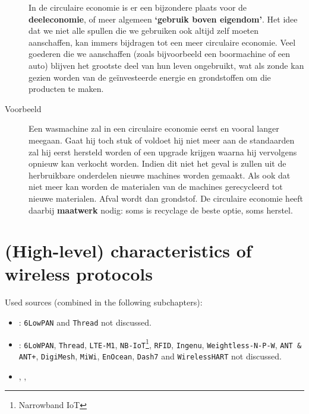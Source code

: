 \documentclass[11pt,a4paper,twoside]{article} %
\begin{document}
\begin{description}
	In de circulaire economie is er een bijzondere plaats voor de \textbf{deeleconomie}, of meer algemeen \textbf{`gebruik boven eigendom'}. Het idee dat we niet alle spullen die we gebruiken ook altijd zelf moeten aanschaffen, kan immers bijdragen tot een meer circulaire economie. Veel goederen die we aanschaffen (zoals bijvoorbeeld een boormachine of een auto) blijven het grootste deel van hun leven ongebruikt, wat als zonde kan gezien worden van de geïnvesteerde energie en grondstoffen om die producten te maken.

	\vspace{0.5cm}

	\item [Voorbeeld] Een wasmachine zal in een circulaire economie eerst en vooral langer meegaan. Gaat hij toch stuk of voldoet hij niet meer aan de standaarden zal hij eerst hersteld worden of een upgrade krijgen waarna hij vervolgens opnieuw kan verkocht worden. Indien dit niet het geval is zullen uit de herbruikbare onderdelen nieuwe machines worden gemaakt. Als ook dat niet meer kan worden de materialen van de machines gerecycleerd tot nieuwe materialen. Afval wordt dan grondstof. De circulaire economie heeft daarbij \textbf{maatwerk} nodig: soms is recyclage de beste optie, soms herstel.
\end{description}


\section{(High-level) characteristics of wireless protocols}

Used sources (combined in the following subchapters):
\vspace{-0.5cm}
\begin{itemize}
	\itemsep0em
	\item \cite{wireless1}: \texttt{6LowPAN} and \texttt{Thread} not discussed.
	\item \cite{wireless2}: \texttt{6LoWPAN}, \texttt{Thread}, \texttt{LTE-M1}, \texttt{NB-IoT}\footnote{Narrowband IoT}, \texttt{RFID}, \texttt{Ingenu}, \texttt{Weightless-N-P-W}, \texttt{ANT \& ANT+}, \texttt{DigiMesh}, \texttt{MiWi}, \texttt{EnOcean}, \texttt{Dash7} and \texttt{WirelessHART} not discussed.
	\item \cite{wireless3}, \cite{BTzigbee}, \cite{BTvBLE}
\end{itemize}
\end{document}
